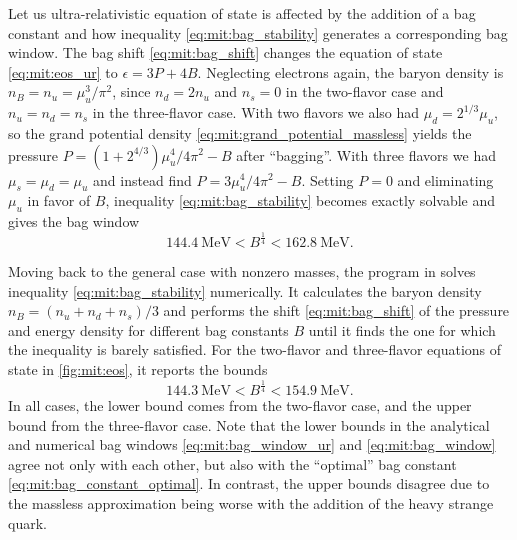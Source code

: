 Let us ultra-relativistic equation of state is affected by the addition of a bag constant
and how inequality \eqref{eq:mit:bag_stability} generates a corresponding bag window.
The bag shift \eqref{eq:mit:bag_shift} changes the equation of state \eqref{eq:mit:eos_ur} to $\epsilon = 3 P + 4 B$.
Neglecting electrons again, the baryon density is $n_B = n_u = \mu_u^3 / \pi^2$,
since $n_d = 2 n_u$ and $n_s=0$ in the two-flavor case and $n_u=n_d=n_s$ in the three-flavor case.
With two flavors we also had $\mu_d = 2^{1/3} \mu_u$,
so the grand potential density \eqref{eq:mit:grand_potential_massless}
yields the pressure $P = (1 + 2^{4/3}) \mu_u^4 / 4 \pi^2 - B$ after ``bagging''.
With three flavors we had $\mu_s = \mu_d = \mu_u$ and instead find $P = 3 \mu_u^4 / 4 \pi^2 - B$.
Setting $P=0$ and eliminating $\mu_u$ in favor of $B$, inequality \eqref{eq:mit:bag_stability} becomes exactly solvable and gives the bag window
\begin{equation}
	\SI{144.4}{\mega\electronvolt} < B^\frac14 < \SI{162.8}{\mega\electronvolt}.
\label{eq:mit:bag_window_ur}
\end{equation}

Moving back to the general case with nonzero masses,
the program in  solves inequality \eqref{eq:mit:bag_stability} numerically.
It calculates the baryon density $n_B = (n_u+n_d+n_s)/3$
and performs the shift \eqref{eq:mit:bag_shift} of the pressure and energy density for different bag constants $B$
until it finds the one for which the inequality is barely satisfied.
For the two-flavor and three-flavor equations of state in \cref{fig:mit:eos}, it reports the bounds
\begin{equation}
	\SI{144.3}{\mega\electronvolt} < B^\frac14 < \SI{154.9}{\mega\electronvolt} .
\label{eq:mit:bag_window}
\end{equation}
In all cases, the lower bound comes from the two-flavor case, and the upper bound from the three-flavor case.
Note that the lower bounds in the analytical and numerical bag windows \eqref{eq:mit:bag_window_ur} and \eqref{eq:mit:bag_window}
agree not only with each other, but also with the ``optimal'' bag constant \eqref{eq:mit:bag_constant_optimal}.
In contrast, the upper bounds disagree due to the massless approximation being worse with the addition of the heavy strange quark.



